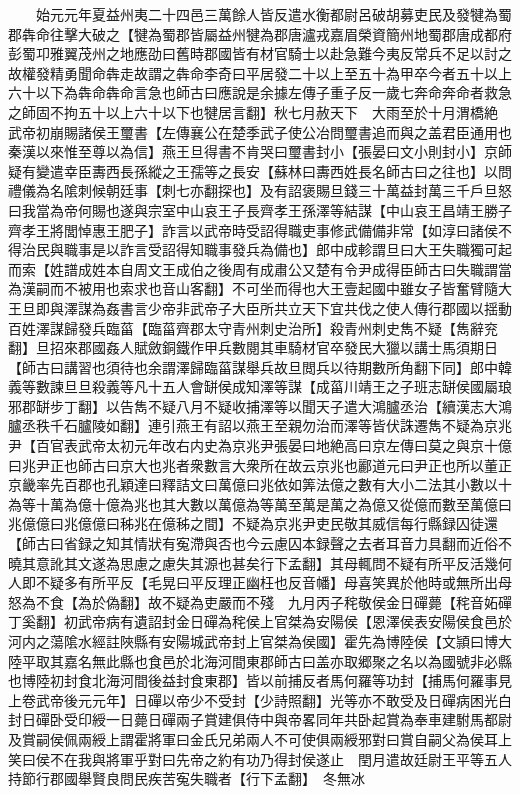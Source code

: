 　　始元元年夏益州夷二十四邑三萬餘人皆反遣水衡都尉呂破胡募吏民及發犍為蜀郡犇命往擊大破之【犍為蜀郡皆屬益州犍為郡唐瀘戎嘉眉榮資簡州地蜀郡唐成都府彭蜀卭雅翼茂州之地應劭曰舊時郡國皆有材官騎士以赴急難今夷反常兵不足以討之故權發精勇聞命犇走故謂之犇命李奇曰平居發二十以上至五十為甲卒今者五十以上六十以下為犇命犇命言急也師古曰應說是余據左傳子重子反一歲七奔命奔命者救急之師固不拘五十以上六十以下也犍居言翻】秋七月赦天下　大雨至於十月渭橋絶　武帝初崩賜諸侯王璽書【左傳襄公在楚季武子使公冶問璽書追而與之盖君臣通用也秦漢以來惟至尊以為信】燕王旦得書不肯哭曰璽書封小【張晏曰文小則封小】京師疑有變遣幸臣夀西長孫縱之王孺等之長安【蘇林曰夀西姓長名師古曰之往也】以問禮儀為名隂刺候朝廷事【刺七亦翻探也】及有詔褒賜旦錢三十萬益封萬三千戶旦怒曰我當為帝何賜也遂與宗室中山哀王子長齊孝王孫澤等結謀【中山哀王昌靖王勝子齊孝王將閭悼惠王肥子】詐言以武帝時受詔得職吏事修武備備非常【如淳曰諸侯不得治民與職事是以詐言受詔得知職事發兵為備也】郎中成軫謂旦曰大王失職獨可起而索【姓譜成姓本自周文王成伯之後周有成肅公又楚有令尹成得臣師古曰失職謂當為漢嗣而不被用也索求也音山客翻】不可坐而得也大王壹起國中雖女子皆奮臂隨大王旦即與澤謀為姦書言少帝非武帝子大臣所共立天下宜共伐之使人傳行郡國以揺動百姓澤謀歸發兵臨菑【臨菑齊郡太守青州刺史治所】殺青州刺史雋不疑【雋辭兖翻】旦招來郡國姦人賦斂銅鐵作甲兵數閱其車騎材官卒發民大獵以講士馬須期日【師古曰講習也須待也余謂澤歸臨菑謀舉兵故旦閲兵以待期數所角翻下同】郎中韓義等數諫旦旦殺義等凡十五人會缾侯成知澤等謀【成菑川靖王之子班志缾侯國屬琅邪郡缾步丁翻】以告雋不疑八月不疑收捕澤等以聞天子遣大鴻臚丞治【續漢志大鴻臚丞秩千石臚陵如翻】連引燕王有詔以燕王至親勿治而澤等皆伏誅遷雋不疑為京兆尹【百官表武帝太初元年改右内史為京兆尹張晏曰地絶高曰京左傳曰莫之與京十億曰兆尹正也師古曰京大也兆者衆數言大衆所在故云京兆也酈道元曰尹正也所以董正京畿率先百郡也孔穎達曰釋詰文曰萬億曰兆依如筭法億之數有大小二法其小數以十為等十萬為億十億為兆也其大數以萬億為等萬至萬是萬之為億又從億而數至萬億曰兆億億曰兆億億曰秭兆在億秭之間】不疑為京兆尹吏民敬其威信每行縣録囚徒還【師古曰省録之知其情狀有寃滯與否也今云慮囚本録聲之去者耳音力具翻而近俗不曉其意訛其文遂為思慮之慮失其源也甚矣行下孟翻】其母輒問不疑有所平反活幾何人即不疑多有所平反【毛晃曰平反理正幽枉也反音幡】母喜笑異於他時或無所出母怒為不食【為於偽翻】故不疑為吏嚴而不殘　九月丙子秺敬侯金日磾薨【秺音妬磾丁奚翻】初武帝病有遺詔封金日磾為秺侯上官桀為安陽侯【恩澤侯表安陽侯食邑於河内之蕩隂水經註陜縣有安陽城武帝封上官桀為侯國】霍先為博陸侯【文頴曰博大陸平取其嘉名無此縣也食邑於北海河間東郡師古曰盖亦取郷聚之名以為國號非必縣也博陸初封食北海河間後益封食東郡】皆以前捕反者馬何羅等功封【捕馬何羅事見上卷武帝後元元年】日磾以帝少不受封【少詩照翻】光等亦不敢受及日磾病困光白封日磾卧受印綬一日薨日磾兩子賞建俱侍中與帝畧同年共卧起賞為奉車建駙馬都尉及賞嗣侯佩兩綬上謂霍將軍曰金氏兄弟兩人不可使俱兩綬邪對曰賞自嗣父為侯耳上笑曰侯不在我與將軍乎對曰先帝之約有功乃得封侯遂止　閏月遣故廷尉王平等五人持節行郡國舉賢良問民疾苦寃失職者【行下孟翻】　冬無冰

